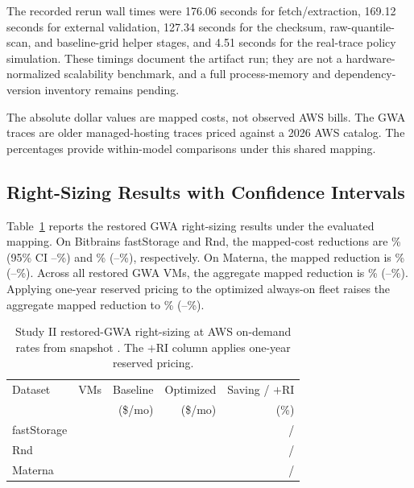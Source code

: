 \documentclass[11pt]{article}
\begin{document}
The recorded rerun wall times were 176.06 seconds for fetch/extraction,
169.12 seconds for external validation, 127.34 seconds for the checksum,
raw-quantile-scan, and baseline-grid helper stages, and 4.51 seconds for the
real-trace policy simulation. These timings document the artifact run; they
are not a hardware-normalized scalability benchmark, and a full
process-memory and dependency-version inventory remains pending.

The absolute dollar values are mapped costs, not observed AWS bills. The GWA
traces are older managed-hosting traces priced against a 2026 AWS catalog.
The percentages provide within-model comparisons under this shared mapping.

\subsection{Right-Sizing Results with Confidence Intervals}

Table~\ref{tab:external} reports the restored GWA right-sizing results under
the evaluated mapping. On Bitbrains fastStorage and Rnd, the mapped-cost
reductions are \extFsSavingsPct\% (95\% CI
\extFsSavingsCiLow--\extFsSavingsCiHigh\%) and \extRndSavingsPct\%
(\extRndSavingsCiLow--\extRndSavingsCiHigh\%), respectively. On Materna, the
mapped reduction is \extMatSavingsPct\%
(\extMatSavingsCiLow--\extMatSavingsCiHigh\%). Across all restored GWA VMs,
the aggregate mapped reduction is \extOverallSavingsPct\%
(\extOverallSavingsCiLow--\extOverallSavingsCiHigh\%). Applying one-year
reserved pricing to the optimized always-on fleet raises the aggregate mapped
reduction to \extOverallSavingsPctRi\%
(\extOverallSavingsPctRiCiLow--\extOverallSavingsPctRiCiHigh\%).

\begin{table}[t]
\caption{Study II restored-GWA right-sizing at AWS on-demand rates from
snapshot \extSnapshot. The $+$RI column applies one-year reserved pricing.}
\label{tab:external}
\centering
\renewcommand{\arraystretch}{1.08}
\setlength{\tabcolsep}{3.5pt}
\begin{tabular}{@{}l r r r r@{}}
\toprule
Dataset & VMs & Baseline & Optimized & Saving / $+$RI \\
 & & (\$/mo) & (\$/mo) & (\%) \\
\midrule
fastStorage & \extFsVms{} & \extFsBaseline{} & \extFsOptimized{} & \extFsSavingsPct{} / \extFsSavingsPctRi{} \\
Rnd & \extRndVms{} & \extRndBaseline{} & \extRndOptimized{} & \extRndSavingsPct{} / \extRndSavingsPctRi{} \\
Materna & \extMatVms{} & \extMatBaseline{} & \extMatOptimized{} & \extMatSavingsPct{} / \extMatSavingsPctRi{} \\
\bottomrule
\end{tabular}
\end{table}
\end{document}
